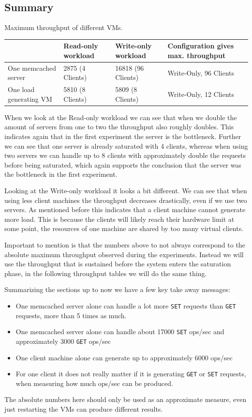 \documentclass[11pt,a4paper]{article}
\begin{document}
\subsection{Summary}
%
\begin{center}
	{Maximum throughput of different VMs.}
	\begin{tabular}{|l|p{3cm}|p{3cm}|p{4cm}|}
		\hline                        & Read-only workload & Write-only workload & Configuration gives max. throughput \\ 
		\hline One memcached server   & 2875 (4 Clients)   & 	16818 (96 Clients)  & Write-Only, 96 Clients       \\ 
		\hline One load generating VM & 5810 (8 Clients)  & 5809 (8 Clients)   & Write-Only, 12 Clients         \\ 
		\hline 
	\end{tabular}
\end{center}
%
When we look at the Read-only workload we can see that when we double the amount of servers from one to two the throughput also roughly doubles. 
%
This indicates again that in the first experiment the server is the bottleneck.
%
Further we can see that one server is already saturated with 4 clients, whereas when using two servers we can handle up to 8 clients with approximately double the requests before being saturated, which again supports the conclusion that the server was the bottleneck in the first experiment.
%
\par
%
Looking at the Write-only workload it looks a bit different.
%
We can see that when using less client machines the throughput decreases drastically, even if we use two servers.
%
As mentioned before this indicates that a client machine cannot generate more load.
%
This is because the clients will likely reach their hardware limit at some point, the resources of one machine are shared by too many virtual clients.
%
\par
%
Important to mention is that the numbers above to not always correspond to the absolute maximum throughput observed during the experiments.
%
Instead we will use the throughput that is sustained before the system enters the saturation phase, in the following throughput tables we will do the same thing.
%
\par
%
Summarizing the sections up to now we have a few key take away messages:
%
\begin{itemize}
	\item One memcached server alone can handle a lot more \texttt{SET} requests than \texttt{GET} requests, more than 5 times as much.
	\item One memcached server alone can handle about 17000 \texttt{SET} ops/sec and approximately 3000 \texttt{GET} ops/sec
	\item One client machine alone can generate up to approximately 6000 ops/sec
	\item For one client it does not really matter if it is generating \texttt{GET} or \texttt{SET} requests, when measuring how much ops/sec can be produced.
\end{itemize}
%
The absolute numbers here should only be used as an approximate measure, even just restarting the VMs can produce different results. 
%
\end{document}
